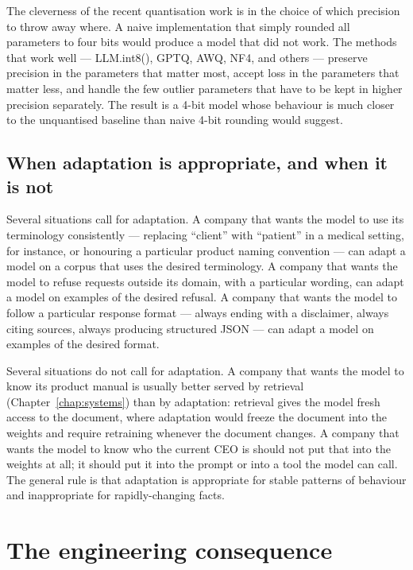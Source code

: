The cleverness of the recent quantisation work is in the
choice of which precision to throw away where. A naive
implementation that simply rounded all parameters to four bits
would produce a model that did not work. The methods that work
well --- LLM.int8(), GPTQ, AWQ, NF4, and others --- preserve
precision in the parameters that matter most, accept loss in
the parameters that matter less, and handle the few outlier
parameters that have to be kept in higher precision separately.
The result is a 4-bit model whose behaviour is much closer to
the unquantised baseline than naive 4-bit rounding would
suggest.

\subsection*{When adaptation is appropriate, and when it is not}

Several situations call for adaptation. A company that wants
the model to use its terminology consistently --- replacing
``client'' with ``patient'' in a medical setting, for instance,
or honouring a particular product naming convention --- can
adapt a model on a corpus that uses the desired terminology. A
company that wants the model to refuse requests outside its
domain, with a particular wording, can adapt a model on
examples of the desired refusal. A company that wants the model
to follow a particular response format --- always ending with a
disclaimer, always citing sources, always producing structured
JSON --- can adapt a model on examples of the desired format.

Several situations do not call for adaptation. A company that
wants the model to know its product manual is usually better
served by retrieval (Chapter~\ref{chap:systems}) than by adaptation: retrieval
gives the model fresh access to the document, where adaptation
would freeze the document into the weights and require
retraining whenever the document changes. A company that wants
the model to know who the current CEO is should not put that
into the weights at all; it should put it into the prompt or
into a tool the model can call. The general rule is that
adaptation is appropriate for stable patterns of behaviour and
inappropriate for rapidly-changing facts.

\section{The engineering consequence}

